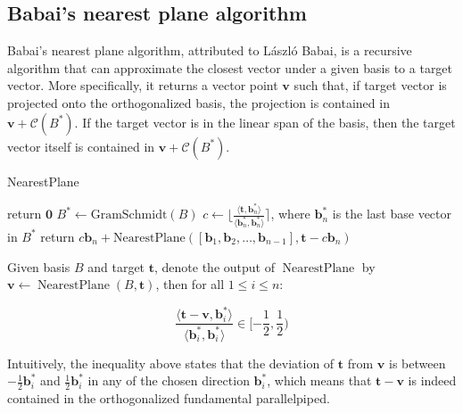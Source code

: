 \subsection{Babai's nearest plane algorithm}\label{subsec:nearestplane}
Babai's nearest plane algorithm, attributed to László Babai, is a recursive algorithm that can approximate the closest vector under a given basis to a target vector. More specifically, it returns a vector point $\mathbf{v}$ such that, if target vector is projected onto the orthogonalized basis, the projection is contained in $\mathbf{v} + \mathcal{C}(B^\ast)$. If the target vector is in the linear span of the basis, then the target vector itself is contained in $\mathbf{v} + \mathcal{C}(B^\ast)$.

\begin{algorithm}
\caption{NearestPlane}
\begin{algorithmic}[1]
        \State return $\mathbf{0}$
    \EndIf 
    \State $B^\ast \leftarrow \text{GramSchmidt}(B)$
    \State $c \leftarrow \lfloor \frac{\langle\mathbf{t}, \mathbf{b}_n^\ast\rangle}{\langle\mathbf{b}_n^\ast, \mathbf{b}_n^\ast\rangle} \rceil$, where $\mathbf{b}_n^\ast$ is the last base vector in $B^\ast$
    \State return $c\mathbf{b}_n + \text{NearestPlane}([\mathbf{b}_1, \mathbf{b}_2, \ldots, \mathbf{b}_{n-1}], \mathbf{t} - c\mathbf{b}_n)$
\end{algorithmic}
\end{algorithm}


\begin{theorem}
    Given basis $B$ and target $\mathbf{t}$, denote the output of $\operatorname{NearestPlane}$ by $\mathbf{v} \leftarrow \operatorname{NearestPlane}(B, \mathbf{t})$, then for all $1 \leq i \leq n$:

    $$
    \frac{
        \langle
            \mathbf{t} - \mathbf{v}, \mathbf{b}_i^\ast
        \rangle
    }{
        \langle
            \mathbf{b}_i^\ast, \mathbf{b}_i^\ast
        \rangle
    } 
    \in [-\frac{1}{2}, \frac{1}{2})
        $$
    \end{theorem}

Intuitively, the inequality above states that the deviation of $\mathbf{t}$ from $\mathbf{v}$ is between $-\frac{1}{2}\mathbf{b}_i^\ast$ and $\frac{1}{2}\mathbf{b}_i^\ast$ in any of the chosen direction $\mathbf{b}_i^\ast$, which means that $\mathbf{t} - \mathbf{v}$ is indeed contained in the orthogonalized fundamental parallelpiped.

